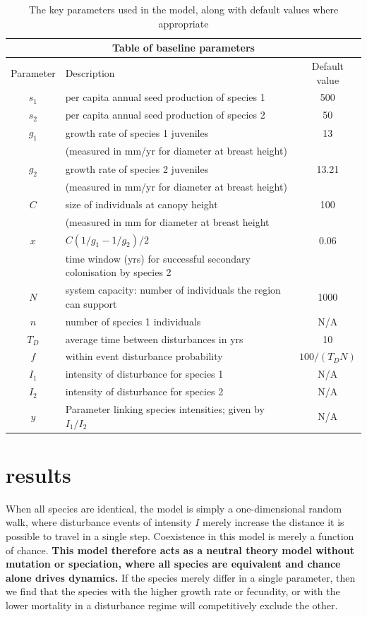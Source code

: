 \begin{table}[htdp]
\begin{center}
\begin{tabular}{|c|l|c|} \hline
\multicolumn{3}{|c|}{Table of baseline parameters} \\ \hline
Parameter & Description & Default value \\ \hline
$s_1$ & per capita annual seed production of species 1 & 500 \\ \hline
$s_2$ & per capita annual seed production of species 2 & 50\\ \hline
$g_1$&growth rate of species 1 juveniles & 13 \\
&(measured in mm/yr for diameter at breast height) &\\ \hline
$g_2$&growth rate of species 2 juveniles & 13.21 \\
&(measured in mm/yr for diameter at breast height) &\\ \hline
$C$& size of individuals at canopy height & 100 \\
& (measured in mm for diameter at breast height&\\ \hline
$x$&$C(1/g_1-1/g_2)/2$&0.06\\
&time window (yrs) for successful secondary colonisation by species 2&\\ \hline
$N$ & system capacity: number of individuals the region can support & 1000 \\ \hline
$n$ & number of species 1 individuals & N/A \\ \hline
$T_D$& average time between disturbances in yrs & 10 \\ \hline
$f$& within event disturbance probability & $100/(T_D N)$ \\ \hline
$I_1$& intensity of disturbance for species 1 & N/A \\ \hline
$I_2$& intensity of disturbance for species 2 & N/A \\ \hline
$y$ &Parameter linking species intensities; given by $I_1/I_2$ & N/A \\ \hline
\end{tabular} \end{center}
\caption{The key parameters used in the model, along with default values where appropriate}
\label{tabparas} 
\end{table}

\section{results}
When all species are identical, the model is simply a one-dimensional random walk, where disturbance events of intensity $I$ merely increase the distance it is possible to travel in a single step. Coexistence in this model is merely a function of chance. \textbf{This model therefore acts as a neutral theory model without mutation or speciation, where all species are equivalent and chance alone drives dynamics.} If the species merely differ in a single parameter, then we find that the species with the higher growth rate or fecundity, or with the lower mortality in a disturbance regime will competitively exclude the other.

